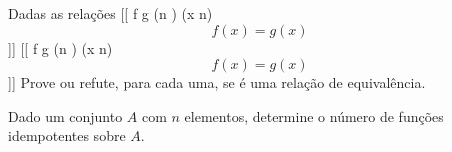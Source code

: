 \begin{exercise}
	Dadas as relações
		[[ f \overset{\forall\exists}{=} g \iffdf (\forall n \eqtype \nats) (\exists x \geq n) \[ f(x) = g(x) \] ]]
		[[ f \overset{\exists\forall}{=} g \iffdf (\exists n \eqtype \nats) (\forall x \geq n) \[ f(x) = g(x) \] ]]
	Prove ou refute, para cada uma, se é uma relação de equivalência.
\end{exercise}

\begin{exercise}
	Dado um conjunto $A$ com $n$ elementos, determine o número de funções idempotentes sobre $A$.
\end{exercise}